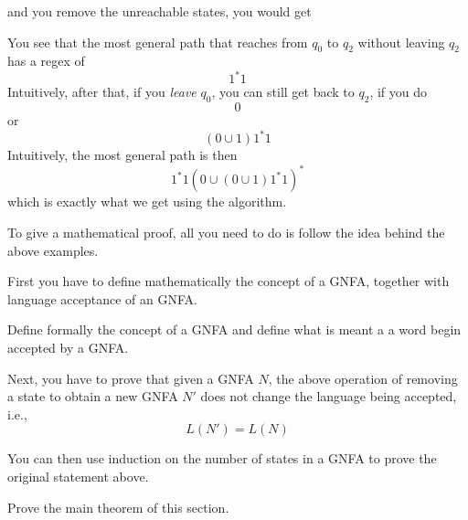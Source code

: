 \begin{center}
\end{center}
and you remove the unreachable states, you would get
\begin{center}
\end{center}
You see that the most general path that reaches from $q_0$
to $q_2$ without leaving $q_2$ has a regex of
\[
1^*1
\]
Intuitively, after that, 
if you \textit{leave} $q_0$, you can still get back to 
$q_2$, if you do
\[
0
\]
or
\[
(0 \cup 1)1^*1
\]
Intuitively, the most general path is then
\[
1^*1 (0 \cup (0 \cup 1)1^*1)^*
\]
which is exactly what we get using the algorithm.


\newpage
To give a mathematical proof, all you need to do is 
follow the idea behind the above examples.

First you have to define mathematically the concept of a GNFA, 
together with language acceptance of an GNFA.

\begin{ex}
Define formally the concept of a GNFA and define what is meant a
a word begin accepted by a GNFA.
\end{ex}

Next, you have to prove that given a GNFA $N$,
the above operation of removing a state to obtain a new GNFA $N'$
does not change the language being accepted, i.e.,
\[
L(N') = L(N)
\]

You can then use induction on the number of states in a GNFA
to prove the original statement above.

\begin{ex}
Prove the main theorem of this section.
\end{ex}
